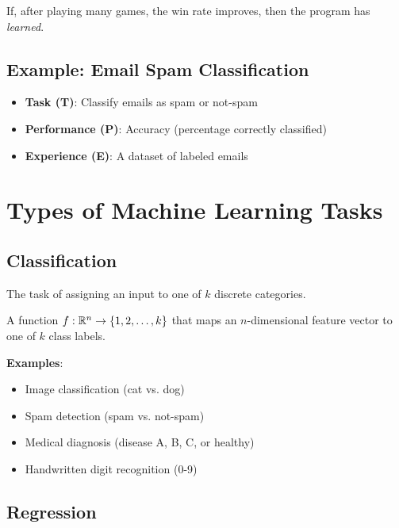 If, after playing many games, the win rate improves, then the program has \textit{learned}.

\subsection{Example: Email Spam Classification}

\begin{itemize}
    \item \textbf{Task (T)}: Classify emails as spam or not-spam
    \item \textbf{Performance (P)}: Accuracy (percentage correctly classified)
    \item \textbf{Experience (E)}: A dataset of labeled emails
\end{itemize}


\section{Types of Machine Learning Tasks}

\subsection{Classification}

The task of assigning an input to one of $k$ discrete categories.

\begin{definitionbox}[Classification]
A function $f: \mathbb{R}^n \rightarrow \{1, 2, \ldots, k\}$ that maps an $n$-dimensional feature vector to one of $k$ class labels.
\end{definitionbox}

\textbf{Examples}:
\begin{itemize}
    \item Image classification (cat vs. dog)
    \item Spam detection (spam vs. not-spam)
    \item Medical diagnosis (disease A, B, C, or healthy)
    \item Handwritten digit recognition (0-9)
\end{itemize}

\subsection{Regression}


